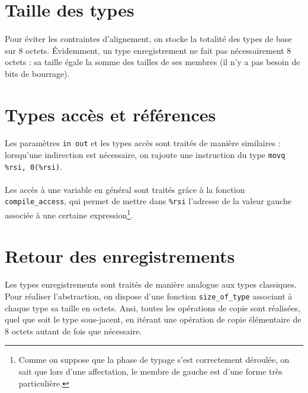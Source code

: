 \documentclass[a4paper,12pt]{article}
\begin{document}
\section{Taille des types}

\paragraph*{}
Pour éviter les contraintes d'alignement, on stocke la totalité des types de base sur 8 octets. Évidemment, un type
enregistrement ne fait pas nécessairement 8 octets : sa taille égale la somme des tailles de ses membres (il n'y a pas
besoin de bits de bourrage).

\section{Types accès et références}

\paragraph*{}
Les paramètres \texttt{in out} et les types accès sont traités de manière similaires : lorsqu'une indirection est nécessaire,
on rajoute une instruction du type \texttt{movq \%rsi, 0(\%rsi)}.

\paragraph*{}
Les accès à une variable en général sont traités grâce à la fonction \texttt{compile\_access}, qui permet
de mettre dans \texttt{\%rsi} l'adresse de la valeur gauche associée à une certaine expression\footnote{Comme on suppose que
la phase de typage s'est correctement déroulée, on sait que lors d'une affectation, le membre de gauche est d'une
forme très particulière.}.

\section{Retour des enregistrements}

\paragraph*{}
Les types enregistrements sont traités de manière analogue aux types classiques. Pour réaliser l'abstraction, on dispose d'une fonction \texttt{size\_of\_type}
associant à chaque type sa taille en octets. Ansi, toutes les opérations de copie sont réalisées, quel que soit le type sous-jacent, en itérant une opération
de copie élémentaire de 8 octets autant de fois que nécessaire.
\end{document}
